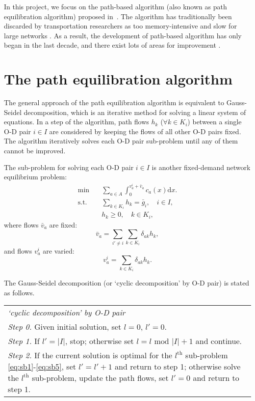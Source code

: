 In this project, we focus on the path-based algorithm (also known as path equilibration algorithm) proposed in~\citet{Dafermos1969}.
The algorithm has traditionally been discarded by transportation researchers as too memory-intensive and slow for large networks \citep{Jayakrishnan1994}.
As a result, the development of path-based algorithm has only began in the last decade, and there exist lots of areas for improvement \citep{Olga2013}.

\section{The path equilibration algorithm}
The general approach of the path equilibration algorithm is equivalent to
Gauss-Seidel decomposition, which is an iterative method for solving a linear system of equations.
In a step of the algorithm,
path flows $h_k$ ($\forall k \in K_i$) between a single O-D pair $i \in I$ are considered by keeping the flows of all other O-D pairs fixed.
The algorithm iteratively solves each O-D pair sub-problem until any of them cannot be improved.

The sub-problem for solving each O-D pair $i \in I$ is another fixed-demand network equilibrium problem:
\begin{align} \label{eq:sb1}
    \min & \quad \sum_{a \in A} \int_0^{v_a^i + \bar{v}_a} c_a(x) \mathrm{d} x.\\
    \text{s.t.} &\quad \sum_{k \in K_i} h_k = \bar{g}_i, \quad i \in I, \\
    & \quad h_k \geq 0, \quad k \in K_i,
\end{align}
where flows $\bar{v}_a$ are fixed:
\begin{equation}
    \bar{v}_a = \sum_{i' \neq i} \sum_{k \in K_i} \delta_{ak} h_k,
\end{equation}
and flows $v_a^i$ are varied:
\begin{equation} \label{eq:sb5}
    v_a^i = \sum_{k \in K_i} \delta_{ak} h_k.
\end{equation}


\newpage
The Gauss-Seidel decomposition (or `cyclic decomposition' by O-D pair) is stated as follows.
\begin{table}[H]
    \begin{tabular}{ m{} }
        \hspace{-.5cm}\emph{`cyclic decomposition' by O-D pair} \citep{Florian} \\
        \emph{Step 0.} Given initial solution, set $l = 0$, $l' = 0$.\\
        \emph{Step 1.} If $l' = |I|$, stop; otherwise set $l = l \text{ mod } |I| + 1$ and continue.\\
        \emph{Step 2.} If the current solution is optimal for the $l^\text{th}$ sub-problem \eqref{eq:sb1}-\eqref{eq:sb5}, set $l' = l' + 1$ and return to step 1; otherwise solve the $l^\text{th}$ sub-problem, update the path flows, set $l' = 0$ and return to step 1.\\
    \end{tabular}
\end{table}

